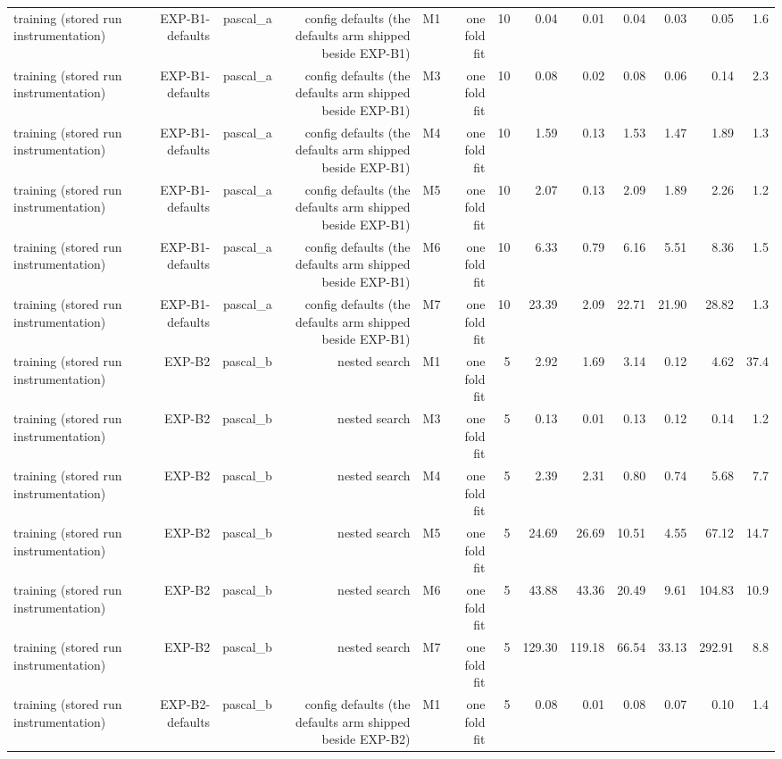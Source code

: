 \begin{table}[htbp]
\begin{tabular}{lrrrrrrrrrrrr}
    training (stored run instrumentation) & EXP-B1-defaults & pascal\_a & config defaults (the defaults arm shipped beside EXP-B1) & M1 & one fold fit & 10 & 0.04 & 0.01 & 0.04 & 0.03 & 0.05 & 1.6 \\
    training (stored run instrumentation) & EXP-B1-defaults & pascal\_a & config defaults (the defaults arm shipped beside EXP-B1) & M3 & one fold fit & 10 & 0.08 & 0.02 & 0.08 & 0.06 & 0.14 & 2.3 \\
    training (stored run instrumentation) & EXP-B1-defaults & pascal\_a & config defaults (the defaults arm shipped beside EXP-B1) & M4 & one fold fit & 10 & 1.59 & 0.13 & 1.53 & 1.47 & 1.89 & 1.3 \\
    training (stored run instrumentation) & EXP-B1-defaults & pascal\_a & config defaults (the defaults arm shipped beside EXP-B1) & M5 & one fold fit & 10 & 2.07 & 0.13 & 2.09 & 1.89 & 2.26 & 1.2 \\
    training (stored run instrumentation) & EXP-B1-defaults & pascal\_a & config defaults (the defaults arm shipped beside EXP-B1) & M6 & one fold fit & 10 & 6.33 & 0.79 & 6.16 & 5.51 & 8.36 & 1.5 \\
    training (stored run instrumentation) & EXP-B1-defaults & pascal\_a & config defaults (the defaults arm shipped beside EXP-B1) & M7 & one fold fit & 10 & 23.39 & 2.09 & 22.71 & 21.90 & 28.82 & 1.3 \\
    training (stored run instrumentation) & EXP-B2 & pascal\_b & nested search & M1 & one fold fit & 5 & 2.92 & 1.69 & 3.14 & 0.12 & 4.62 & 37.4 \\
    training (stored run instrumentation) & EXP-B2 & pascal\_b & nested search & M3 & one fold fit & 5 & 0.13 & 0.01 & 0.13 & 0.12 & 0.14 & 1.2 \\
    training (stored run instrumentation) & EXP-B2 & pascal\_b & nested search & M4 & one fold fit & 5 & 2.39 & 2.31 & 0.80 & 0.74 & 5.68 & 7.7 \\
    training (stored run instrumentation) & EXP-B2 & pascal\_b & nested search & M5 & one fold fit & 5 & 24.69 & 26.69 & 10.51 & 4.55 & 67.12 & 14.7 \\
    training (stored run instrumentation) & EXP-B2 & pascal\_b & nested search & M6 & one fold fit & 5 & 43.88 & 43.36 & 20.49 & 9.61 & 104.83 & 10.9 \\
    training (stored run instrumentation) & EXP-B2 & pascal\_b & nested search & M7 & one fold fit & 5 & 129.30 & 119.18 & 66.54 & 33.13 & 292.91 & 8.8 \\
    training (stored run instrumentation) & EXP-B2-defaults & pascal\_b & config defaults (the defaults arm shipped beside EXP-B2) & M1 & one fold fit & 5 & 0.08 & 0.01 & 0.08 & 0.07 & 0.10 & 1.4 \\

\end{tabular}
\end{table}
